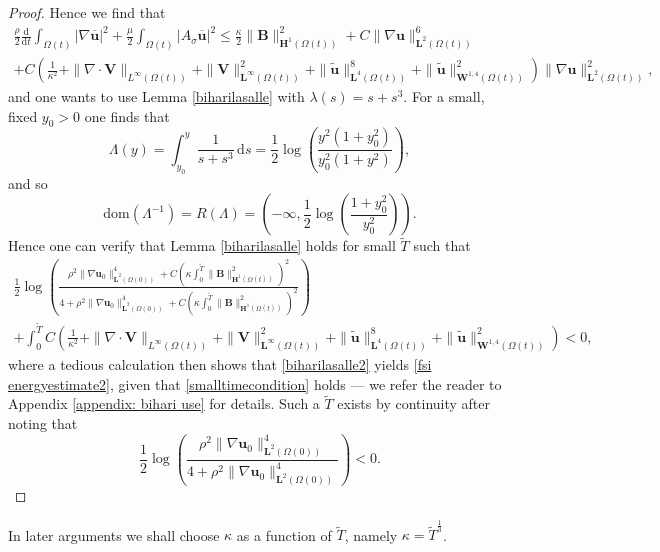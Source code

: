 \documentclass[a4paper]{amsart}
\numberwithin{equation}{section}
\newcommand{\grad}{\nabla}
\newcommand{\Div}{\nabla \cdot}
\theoremstyle{plain}
\newcommand{\mbf}[1]{\mathbf{#1}}
\begin{document}
\begin{proof}
	Hence we find that
	\begin{multline*}
		\frac{\rho}{2} \frac{\mathrm{d}}{\mathrm{d}t} \int_{\Omega(t)} |\grad \overline{\mbf{u}}|^2 + \frac{\mu}{2} \int_{\Omega(t)} |A_{\sigma} \overline{\mbf{u}}|^2 \leq \frac{\kappa}{2} \|\mbf{B}\|_{\mbf{H}^1(\Omega(t))}^2 + C\|\grad \mbf{u}\|_{\mbf{L}^2(\Omega(t))}^6\\
        + C \left(\frac{1}{\kappa^2} + \|\Div\mbf{V}\|_{L^\infty(\Omega(t))} + \|\mbf{V}\|_{\mbf{L}^\infty(\Omega(t))}^2 +\|\widetilde{\mbf{u}}\|_{\mbf{L}^4(\Omega(t))}^8 +\|\widetilde{\mbf{u}}\|_{\mbf{W}^{1,4}(\Omega(t))}^2\right)\|\grad \mbf{u}\|_{\mbf{L}^2(\Omega(t))}^2,
	\end{multline*}
	and one wants to use Lemma \ref{biharilasalle} with $\lambda(s) = s + s^3$.
	For a small, fixed $y_0 > 0$ one finds that 
	\[ \Lambda(y) = \int_{y_0}^y \frac{1}{s + s^3} \, \mathrm{d}s = \frac{1}{2}\log\left(\frac{y^2(1+y_0^2)}{y_0^2(1+y^2)}\right), \]
	and so 
	\[ \text{dom}(\Lambda^{-1}) = R(\Lambda) = \left(-\infty, \frac{1}{2}\log\left(\frac{1+y_0^2}{y_0^2}\right)\right). \]
	Hence one can verify that Lemma \ref{biharilasalle} holds for small $\widetilde{T}$ such that
	\begin{multline}
		\frac{1}{2} \log \left( \frac{\rho^2 \|\grad \mbf{u}_0\|_{\mbf{L}^2(\Omega(0))}^4 + C\left(\kappa \int_0^{\widetilde{T}} \|\mbf{B}\|_{\mbf{H}^1(\Omega(t))}^2 \right)^2}{4 + \rho^2 \|\grad \mbf{u}_0\|_{\mbf{L}^2(\Omega(0))}^4 + C\left(\kappa\int_0^{\widetilde{T}} \|\mbf{B}\|_{\mbf{H}^1(\Omega(t))}^2 \right)^2} \right)\\
        +\int_0^{\widetilde{T}}C \left( \frac{1}{\kappa^2} + \|\Div\mbf{V}\|_{L^\infty(\Omega(t))} + \|\mbf{V}\|_{\mbf{L}^\infty(\Omega(t))}^2 +\|\widetilde{\mbf{u}}\|_{\mbf{L}^4(\Omega(t))}^8 +\|\widetilde{\mbf{u}}\|_{\mbf{W}^{1,4}(\Omega(t))}^2\right) < 0, \label{smalltimecondition}
	\end{multline}
	where a tedious calculation then shows that \eqref{biharilasalle2} yields \eqref{fsi energyestimate2}, given that \eqref{smalltimecondition} holds --- we refer the reader to Appendix \ref{appendix: bihari use} for details.
    Such a $\widetilde{T}$ exists by continuity after noting that 
    \[ \frac{1}{2} \log \left( \frac{\rho^2 \|\grad \mbf{u}_0\|_{\mbf{L}^2(\Omega(0))}^4}{4 + \rho^2 \|\grad \mbf{u}_0\|_{\mbf{L}^2(\Omega(0))}^4} \right) < 0. \]
\end{proof}

In later arguments we shall choose $\kappa$ as a function of $\widetilde{T}$, namely $\kappa = \widetilde{T}^{\frac{1}{3}}$.
\end{document}
